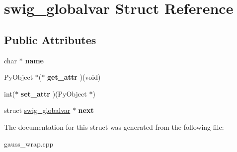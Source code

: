 \hypertarget{structswig__globalvar}{\section{swig\-\_\-globalvar Struct Reference}
\label{structswig__globalvar}
}
\subsection*{Public Attributes}
\begin{DoxyCompactItemize}
\item 
\hypertarget{structswig__globalvar_a32fcb5efb741f97e5c53e1a253cafdd9}{char $\ast$ {\bfseries name}}\label{structswig__globalvar_a32fcb5efb741f97e5c53e1a253cafdd9}

\item 
\hypertarget{structswig__globalvar_a051e346d0cd7608bf99e96726022e88c}{Py\-Object $\ast$($\ast$ {\bfseries get\-\_\-attr} )(void)}\label{structswig__globalvar_a051e346d0cd7608bf99e96726022e88c}

\item 
\hypertarget{structswig__globalvar_a494e3d5a5f1fb694b7738fdd1ffdd657}{int($\ast$ {\bfseries set\-\_\-attr} )(Py\-Object $\ast$)}\label{structswig__globalvar_a494e3d5a5f1fb694b7738fdd1ffdd657}

\item 
\hypertarget{structswig__globalvar_a6b7f8fdec3a5c39a52b33c916d7ba028}{struct \hyperlink{structswig__globalvar}{swig\-\_\-globalvar} $\ast$ {\bfseries next}}\label{structswig__globalvar_a6b7f8fdec3a5c39a52b33c916d7ba028}

\end{DoxyCompactItemize}


The documentation for this struct was generated from the following file\-:\begin{DoxyCompactItemize}
\item 
gauss\-\_\-wrap.\-cpp\end{DoxyCompactItemize}
